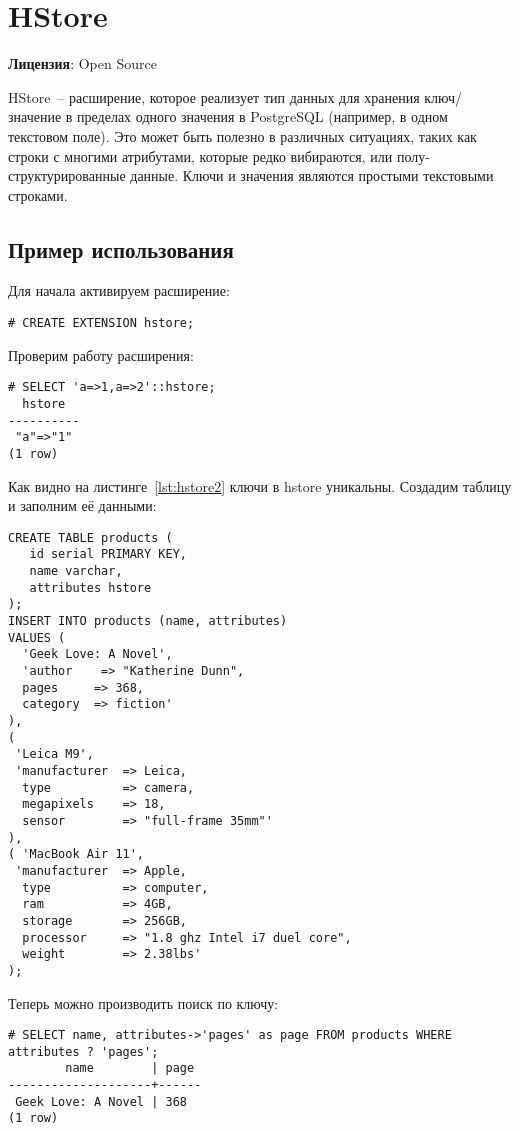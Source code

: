 \section{HStore}
\textbf{Лицензия}: Open Source

HStore~-- расширение, которое реализует тип данных для хранения ключ/значение в пределах одного значения в PostgreSQL (например, в одном текстовом поле). Это может быть полезно в различных ситуациях, таких как строки с многими атрибутами, которые редко вибираются, или полу-структурированные данные. Ключи и значения являются простыми текстовыми строками.

\subsection{Пример использования}
Для начала активируем расширение:
\begin{lstlisting}[label=lst:hstore1,caption=Активация hstore]
# CREATE EXTENSION hstore;
\end{lstlisting}

Проверим работу расширения:
\begin{lstlisting}[label=lst:hstore2,caption=Проверка hstore]
# SELECT 'a=>1,a=>2'::hstore;
  hstore  
----------
 "a"=>"1"
(1 row)
\end{lstlisting}

Как видно на листинге~\ref{lst:hstore2} ключи в hstore уникальны. Создадим таблицу и заполним её данными:

\begin{lstlisting}[label=lst:hstore3,caption=Проверка hstore]
CREATE TABLE products (
   id serial PRIMARY KEY,
   name varchar,
   attributes hstore
);   
INSERT INTO products (name, attributes)
VALUES (
  'Geek Love: A Novel',
  'author    => "Katherine Dunn",
  pages     => 368,
  category  => fiction'
),
(
 'Leica M9',
 'manufacturer  => Leica,
  type          => camera,
  megapixels    => 18,
  sensor        => "full-frame 35mm"'
),
( 'MacBook Air 11',
 'manufacturer  => Apple,
  type          => computer,
  ram           => 4GB,
  storage       => 256GB,
  processor     => "1.8 ghz Intel i7 duel core",
  weight        => 2.38lbs'
);
\end{lstlisting}

Теперь можно производить поиск по ключу:
\begin{lstlisting}[label=lst:hstore4,caption=Поиск по ключу]
# SELECT name, attributes->'pages' as page FROM products WHERE attributes ? 'pages';
        name        | page 
--------------------+------
 Geek Love: A Novel | 368
(1 row)
\end{lstlisting}

